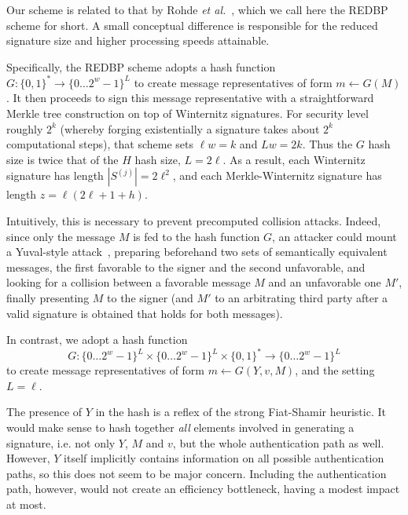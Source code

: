 \documentclass[11pt]{llncs}
\begin{document}
Our scheme is related to that by Rohde \emph{et al.}~\cite{rohde-eisenbarth-dahmen-buchmann-paar}, which we call here the REDBP scheme for short. A small conceptual difference is responsible for the reduced signature size and higher processing speeds attainable.


Specifically, the REDBP scheme adopts a hash function $G: \{0, 1\}^* \rightarrow \{0 \dots 2^w-1\}^L$ to create message representatives of form $m \gets G(M)$. It then proceeds to sign this message representative with a straightforward Merkle tree construction on top of Winternitz signatures. For security level roughly $2^k$ (whereby forging existentially a signature takes about $2^k$ computational steps), that scheme sets $\ell w = k$ and $L w = 2k$. 
Thus the $G$ hash size is twice that of the $H$ hash size, $L = 2\ell$. As a result, each Winternitz signature has length $|S^{(j)}| = 2\ell^2$, and each Merkle-Winternitz signature has length $z = \ell(2\ell + 1 + h)$.

Intuitively, this is necessary to prevent precomputed collision attacks. Indeed, since only the message $M$ is fed to the hash function $G$, an attacker could mount a Yuval-style attack~\cite{yuval}, preparing beforehand two sets of semantically equivalent messages, the first favorable to the signer and the second unfavorable, and looking for a collision between a favorable message $M$ and an unfavorable one $M'$, finally presenting $M$ to the signer (and $M'$ to an arbitrating third party after a valid signature is obtained that holds for both messages).

In contrast, we adopt a hash function
\[
G: \{0 \dots 2^w-1\}^L \times \{0 \dots 2^w-1\}^L \times \{0, 1\}^* \rightarrow \{0 \dots 2^w-1\}^L
\]
to create message representatives of form $m \gets G(Y, v, M)$, and the setting $L = \ell$.


The presence of $Y$ in the hash is a reflex of the strong Fiat-Shamir heuristic.
It would make sense to hash together \emph{all} elements involved in generating a signature, i.e. not only $Y$, $M$ and $v$, but the whole authentication path as well. However, $Y$ itself implicitly contains information on all possible authentication paths, so this does not seem to be major concern. Including the authentication path, however, would not create an efficiency bottleneck, having a modest impact at most.
\end{document}
